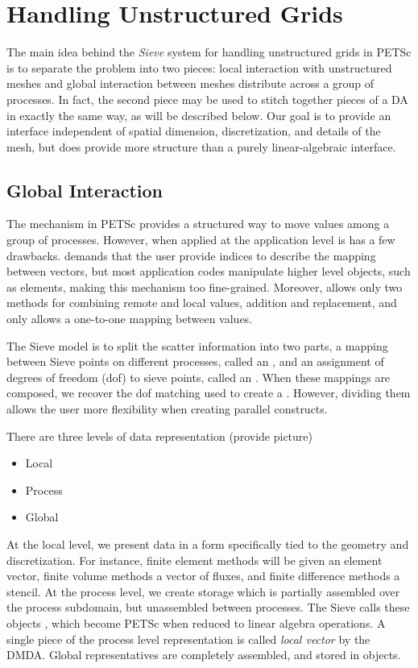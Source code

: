 \section{Handling Unstructured Grids}

    The main idea behind the \emph{Sieve} system for handling unstructured grids in PETSc is to separate the problem
into two pieces: local interaction with unstructured meshes and global interaction between meshes distribute across a
group of processes. In fact, the second piece may be used to stitch together pieces of a DA in exactly the same way, as
will be described below. Our goal is to provide an interface independent of spatial dimension, discretization, and
details of the mesh, but does provide more structure than a purely linear-algebraic interface.

\subsection{Global Interaction}

    The  mechanism in PETSc provides a structured way to move values among a group of
processes. However, when applied at the application level is has a few drawbacks.  demands that the
user provide indices to describe the mapping between vectors, but most application codes manipulate higher level
objects, such as elements, making this mechanism too fine-grained. Moreover,  allows only two methods
for combining remote and local values, addition and replacement, and only allows a one-to-one mapping between values.

    The Sieve model is to split the scatter information into two parts, a mapping between Sieve points on different
processes, called an , and an assignment of degrees of freedom (dof) to sieve points, called an
. When these mappings are composed, we recover the dof matching used to create a . However,
dividing them allows the user more flexibility when creating parallel constructs.

There are three levels of data representation (provide picture)
\begin{itemize}
  \item Local

  \item Process

  \item Global
\end{itemize}
At the local level, we present data in a form specifically tied to the geometry and discretization. For instance, finite
element methods will be given an element vector, finite volume methods a vector of fluxes, and finite difference methods
a stencil. At the process level, we create storage which is partially assembled over the process subdomain, but
unassembled between processes. The Sieve calls these objects , which become PETSc  when
reduced to linear algebra operations. A single piece of the process level representation is called \emph{local vector}
by the DMDA. Global representatives are completely assembled, and stored in  objects.


